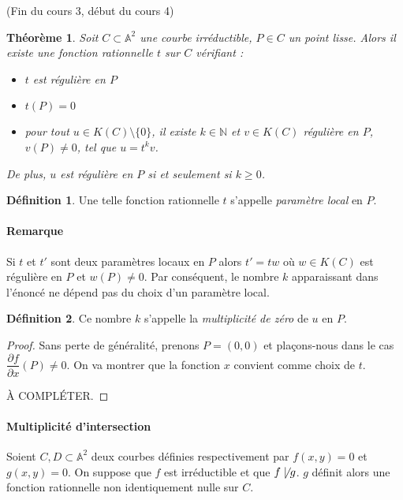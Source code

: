 \documentclass[a4paper, 11pt]{article}
\newtheorem{théorème}{Théorème}
\theoremstyle{definition}
\newtheorem{définition}{Définition}
\newcommand{\integer}{\mathbb{N}}
\newcommand{\aff}{\mathbb{A}}
\newcommand{\derivp}[2]{\dfrac{\partial #1}{\partial #2}}
\begin{document}
(Fin du cours 3, début du cours 4)

\begin{théorème}
  Soit $C \subset \aff^2$ une courbe irréductible, $P \in C$ un point
  \emph{lisse}. Alors il existe une fonction rationnelle $t$ sur $C$
  vérifiant :
  \begin{itemize}
  \item $t$ est régulière en $P$
  \item $t(P) = 0$
  \item pour tout $u \in K(C)\setminus\{0\}$, il existe
    $k \in \integer$ et $v \in K(C)$ régulière en $P$, $v(P)\neq 0$,
    tel que $u = t^k v$.
  \end{itemize}
  De plus, $u$ est régulière en $P$ si et seulement si $k \geq 0$.
\end{théorème}

\begin{définition}
  Une telle fonction rationnelle $t$ s'appelle \emph{paramètre local}
  en $P$.
\end{définition}

\paragraph{Remarque} Si $t$ et $t'$ sont deux paramètres locaux en $P$
alors $t' = tw$ où $w \in K(C)$ est régulière en $P$ et $w(P) \neq
0$. Par conséquent, le nombre $k$ apparaissant dans l'énoncé ne dépend
pas du choix d'un paramètre local.

\begin{définition}
  Ce nombre $k$ s'appelle la \emph{multiplicité de zéro} de $u$ en $P$.
\end{définition}
\begin{proof}
  Sans perte de généralité, prenons $P = (0,0)$ et plaçons-nous dans
  le cas $\derivp{f}{x}(P) \neq 0$. On va montrer que la fonction $x$
  convient comme choix de $t$.

  À COMPLÉTER.
\end{proof}

\paragraph{Multiplicité d'intersection} Soient $C, D \subset \aff^2$
deux courbes définies respectivement par $f(x,y) = 0$ et $g(x,y) =
0$.
On suppose que $f$ est irréductible et que $f \not\mid g$. $g$ définit
alors une fonction rationnelle non identiquement nulle sur $C$.
\end{document}
